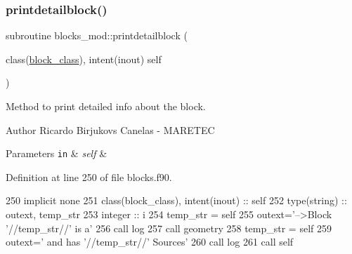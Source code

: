 \subsubsection{\texorpdfstring{printdetailblock()}{printdetailblock()}}
{\footnotesize\ttfamily subroutine blocks\+\_\+mod\+::printdetailblock (\begin{DoxyParamCaption}\item[{class(\mbox{\hyperlink{structblocks__mod_1_1block__class}{block\+\_\+class}}), intent(inout)}]{self }\end{DoxyParamCaption})\hspace{0.3cm}{\ttfamily [private]}}



Method to print detailed info about the block. 

\begin{DoxyAuthor}{Author}
Ricardo Birjukovs Canelas -\/ M\+A\+R\+E\+T\+EC
\end{DoxyAuthor}

\begin{DoxyParams}[1]{Parameters}
\mbox{\tt in}  & {\em self} & \\
\hline
\end{DoxyParams}


Definition at line 250 of file blocks.\+f90.


\begin{DoxyCode}
250     \textcolor{keywordtype}{implicit none}
251     \textcolor{keywordtype}{class}(block\_class), \textcolor{keywordtype}{intent(inout)} :: self
252     \textcolor{keywordtype}{type}(string) :: outext, temp\_str
253     \textcolor{keywordtype}{integer} :: i
254     temp\_str = self%
255     outext=\textcolor{stringliteral}{'-->Block '}//temp\_str//\textcolor{stringliteral}{' is a'}
256     \textcolor{keyword}{call }log%
257     \textcolor{keyword}{call }geometry%
258     temp\_str = self%
259     outext=\textcolor{stringliteral}{'      and has '}//temp\_str//\textcolor{stringliteral}{' Sources'}
260     \textcolor{keyword}{call }log%
261     \textcolor{keyword}{call }self%
\end{DoxyCode}
\mbox{\label{namespaceblocks__mod_a5d11f4958d950c7f436c040bc4133ea0}} 
